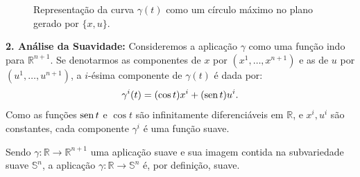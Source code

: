 {\begin{figure}[htbp]
		\caption{Representação da curva $\gamma(t)$ como um círculo máximo no plano gerado por $\{x, u\}$.}
	\end{figure}
	
	\textbf{2. Análise da Suavidade:}
	Consideremos a aplicação $\gamma$ como uma função indo para $\mathbb{R}^{n+1}$. Se denotarmos as componentes de $x$ por $(x^1, \dots, x^{n+1})$ e as de $u$ por $(u^1, \dots, u^{n+1})$, a $i$-ésima componente de $\gamma(t)$ é dada por:
	\begin{equation*}
		\gamma^i(t) = (\cos t)x^i + (\operatorname{sen} t)u^i.
	\end{equation*}
	Como as funções $\operatorname{sen} t$ e $\cos t$ são infinitamente diferenciáveis em $\mathbb{R}$, e $x^i, u^i$ são constantes, cada componente $\gamma^i$ é uma função suave. 
	
	Sendo $\gamma : \mathbb{R} \to \mathbb{R}^{n+1}$ uma aplicação suave e sua imagem contida na subvariedade suave $\mathbb{S}^n$, a aplicação $\gamma : \mathbb{R} \to \mathbb{S}^n$ é, por definição, suave.
}
